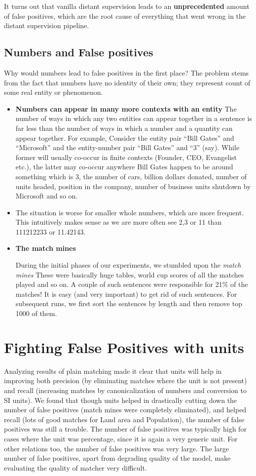 \documentclass[a4paper,10pt]{article}
\begin{document}
It turns out that vanilla distant supervision leads to an \textbf{unprecedented} amount of false positives, which are the root cause
of everything that went wrong in the distant supervision pipeline.

\subsection{Numbers and False positives}
Why would numbers lead to false positives in the first place?
The problem stems from the fact that numbers have no identity of their own; they represent count of
some real entity or phenomenon.

\begin{itemize}
 \item \textbf{Numbers can appear in many more contexts with an entity}
The number of ways in which any two entities can appear together
in a sentence is far less than the number of ways in which a number and a quantity can appear
together. For example, Consider the entity pair “Bill Gates” and “Microsoft” and the entity-number
pair “Bill Gates” and “3” (say). While former will usually co-occur in finite contexts (Founder,
CEO, Evangelist etc.), the latter may co-occur anywhere Bill Gates happen to be around something
which is 3, the number of cars, billion dollars donated, number of units headed, position in the
company, number of business units shutdown by Microsoft and so on.
\item The situation is worse for smaller whole numbers, which are more frequent. This intuitively makes
sense as we are more often see 2,3 or 11 than 111212233 or 11.42143.
\item \textbf{The match mines}

During the initial phases of our experiments, we stumbled upon the \emph{match mines}
These were basically huge tables, world cup scores of all the matches played and so on.
A couple of such sentences were responsible for 21\% of the matches!
It is easy (and very important) to get rid of such sentences. For subsequent runs, we first sort the sentences by length and then remove
top 1000 of them.
\end{itemize}


\section{Fighting False Positives with units}
Analyzing results of plain matching made it clear that units will help in improving both precision
(by eliminating matches where the unit is not present) and recall (increasing matches by
canonicalization of numbers and conversion to SI units). We found that though units helped in
drastically cutting down the number of false positives (match mines were completely eliminated),
and helped recall (lots of good matches for Land area and Population), the number of false positives
was still a trouble. The number of false positives was typically high for cases where the unit was
percentage, since it is again a very generic unit. For other relations too, the number of false
positives was very large. The large number of false positives, apart from degrading quality of the
model, make evaluating the quality of matcher very difficult.
\end{document}
